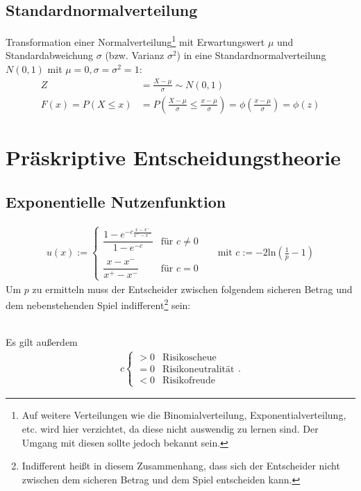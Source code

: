 \documentclass{panikzettel}
\begin{document}
\subsection{Standardnormalverteilung}
Transformation einer Normalverteilung\footnote{Auf weitere Verteilungen wie die Binomialverteilung, Exponentialverteilung, etc. wird hier verzichtet, da diese nicht auswendig zu lernen sind. Der Umgang mit diesen sollte jedoch bekannt sein.} mit Erwartungswert $ \mu $ und Standardabweichung $ \sigma $ (bzw. Varianz $ \sigma^2 $) in eine Standardnormalverteilung $ N(0,1) $ mit $ \mu = 0, \sigma = \sigma^2 = 1 $:
\begin{align*}
	Z &= \frac{X - \mu}{\sigma} \sim N(0,1)\\
	F(x) = P(X \leq x) &= P\left(\frac{X-\mu}{\sigma} \leq \frac{x-\mu}{\sigma}\right) = \phi \left(\frac{x-\mu}{\sigma}\right) = \phi(z)
\end{align*}

\newpage
\section{Präskriptive Entscheidungstheorie}

\subsection{Exponentielle Nutzenfunktion}
\begin{align*}
	u(x) := \begin{cases}
	\dfrac{1 - e ^{-c\frac{x-x^-}{x^+-x^-}}}{1-e^{-c}} & \text{für } c \neq 0\\\\
	\dfrac{x-x^-}{x^+-x^-} & \text{für } c = 0
	\end{cases} && \text{mit } c := -2\text{ln}\left(\frac{1}{p}-1\right)
\end{align*}
Um $ p $ zu ermitteln muss der Entscheider zwischen folgendem sicheren Betrag und dem nebenstehenden Spiel indifferent\footnote{Indifferent heißt in diesem Zusammenhang, dass sich der Entscheider nicht zwischen dem sicheren Betrag und dem Spiel entscheiden kann.} sein:
\begin{figure}[h]
	\centering
\end{figure}\\
Es gilt außerdem
\begin{align*}
c\left\lbrace \begin{array}{cl}
>0 & \text{Risikoscheue}\\
=0 & \text{Risikoneutralität}\\
<0 & \text{Risikofreude}
\end{array}\right. .
\end{align*}
\end{document}
